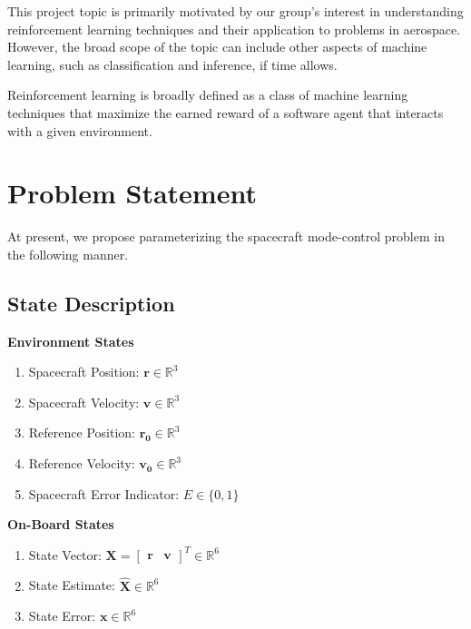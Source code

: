 \documentclass[]{article}
\begin{document}
This project topic is primarily motivated by our group's interest in understanding reinforcement learning techniques and their application to problems in aerospace. However, the broad scope of the topic can include other aspects of machine learning, such as classification and inference, if time allows. 

Reinforcement learning is broadly defined as a class of machine learning techniques that maximize the earned reward of a software agent that interacts with a given environment. 

\section{Problem Statement}
At present, we propose parameterizing the spacecraft mode-control problem in the following manner. 

\subsection{State Description}
\textbf{Environment States}

\begin{enumerate}
	\item Spacecraft Position: $\mathbf{r} \in \mathbb{R}^3$
	\item Spacecraft Velocity: $\mathbf{v} \in \mathbb{R}^3$
	\item Reference Position: $\mathbf{r_0} \in \mathbb{R}^3$
	\item Reference Velocity: $\mathbf{v_0} \in \mathbb{R}^3$
	\item Spacecraft Error Indicator: $E \in \{0,1\}$
\end{enumerate}

\textbf{On-Board States}
\begin{enumerate}
	\item State Vector: $\mathbf{X}= \begin{bmatrix} \mathbf{r} &\mathbf{v}\end{bmatrix}^T \in \mathbb{R}^6$
	\item State Estimate: $\mathbf{\hat{X}} \in \mathbb{R}^6$
	\item State Error: $\mathbf{x} \in \mathbb{R}^6$
\end{enumerate}
\end{document}
